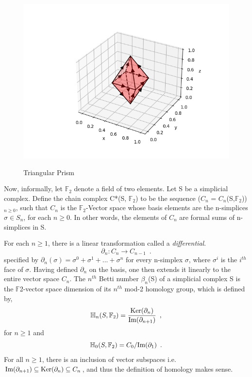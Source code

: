 \begin{figure}[H]%
    \centering
    \captionsetup{justification=centering}
{{\includegraphics[width=12cm]{graph/simplex_structure.png} }}%
    \caption{Triangular Prism}
    \label{fig:example}%
\end{figure}

Now, informally, let $\mathbb{F}_2$ denote a field of two elements. Let S be a simplicial complex. Define the chain complex C*(S, $\mathbb{F}_2$) to be the sequence ($C_n$ = $C_n$(S,$\mathbb{F}_2$))$_{n\geq0}$, such that $C_n$ is the $\mathbb{F}_2$-Vector space whose basis elements are the n-simplices $\sigma \in  S_n$, for each $n\geq0$. In other words, the elements of $C_n$ are formal sums of n-simplices in S. 

For each $n\geq1$, there is a linear transformation called a \textit{differential}.
\begin{equation}
    \partial_n : C_n \rightarrow C_{n-1} \enspace{.}
\end{equation}
specified by $\partial_n(\sigma) = \sigma^0 + \sigma^1 + ... + \sigma^n$ for every n-simplex $\sigma$, where $\sigma^i$ is the $i^{th}$ face of $\sigma$. Having defined $\partial_n$ on the basis, one then extends it linearly to the entire vector space $C_n$. The $n^{th}$ Betti number $\beta_n$(S) of a simplicial complex S is the $\mathbb{F}$2-vector space dimension of its $n^{th}$ mod-2 homology group, which is defined by,
\begin{equation}
    \mathbb{H}_n(S, \mathbb{F}_2) = \frac{\text{Ker}(\partial_n)}{ \text{Im}(\partial_{n+1})} \enspace{,}
\end{equation}
for  $n\geq 1$ and
\begin{equation}
    \mathbb{H}_0(S, \mathbb{F}_2) = C_0/\text{Im}(\partial_{1}) \enspace{.}
\end{equation}
For all $n\geq1$, there is an inclusion of vector subspaces i.e.~$\text{Im}(\partial_{n+1}) \subseteq \text{Ker}(\partial_{n}) \subseteq C_n$, and thus the definition of homology makes sense.

